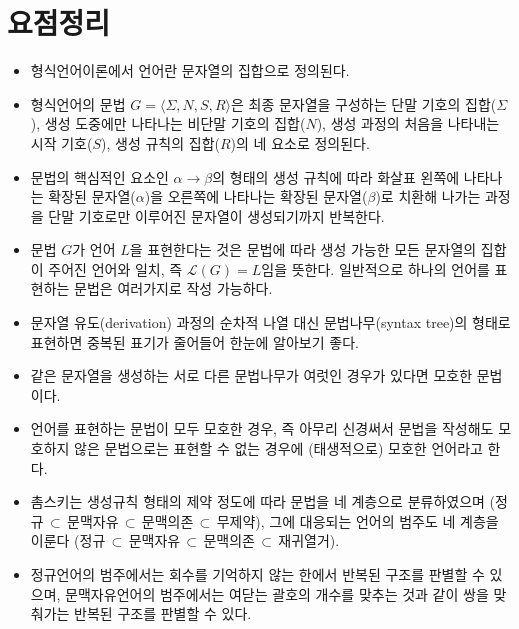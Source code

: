 \section*{요점정리}
\begin{itemize}
    \item 형식언어이론에서 언어란 문자열의 집합으로 정의된다.
    \item 형식언어의 문법 $G=\langle\Sigma,N,S,R\rangle$은
    최종 문자열을 구성하는 단말 기호의 집합($\Sigma$),
    생성 도중에만 나타나는 비단말 기호의 집합($N$),
    생성 과정의 처음을 나타내는 시작 기호($S$),
    생성 규칙의 집합($R$)의 네 요소로 정의된다.
    \item 문법의 핵심적인 요소인 $\alpha\to\beta$의 형태의 생성 규칙에 따라
    화살표 왼쪽에 나타나는 확장된 문자열($\alpha$)을 오른쪽에 나타나는
    확장된 문자열($\beta$)로 치환해 나가는 과정을 단말 기호로만 이루어진
    문자열이 생성되기까지 반복한다.
    \item 문법 $G$가 언어 $L$을 표현한다는 것은 문법에 따라 생성 가능한 모든
    문자열의 집합이 주어진 언어와 일치, 즉 $\mathcal{L}(G) = L$임을 뜻한다.
    일반적으로 하나의 언어를 표현하는 문법은 여러가지로 작성 가능하다.
    \item 문자열 유도(derivation) 과정의 순차적 나열 대신
    문법나무(syntax tree)의 형태로 표현하면 중복된 표기가 줄어들어
    한눈에 알아보기 좋다.
    \item 같은 문자열을 생성하는 서로 다른 문법나무가 여럿인 경우가
    있다면 모호한 문법이다.
    \item 언어를 표현하는 문법이 모두 모호한 경우, 즉 아무리 신경써서
    문법을 작성해도 모호하지 않은 문법으로는 표현할 수 없는 경우에
    (태생적으로) 모호한 언어라고 한다.
    \item 촘스키는 생성규칙 형태의 제약 정도에 따라 문법을 네 계층으로 분류하였으며
    (정규$\,\subset\,$문맥자유$\,\subset\,$문맥의존$\,\subset\,$무제약),
    그에 대응되는 언어의 범주도 네 계층을 이룬다
    (정규$\,\subset\,$문맥자유$\,\subset\,$문맥의존$\,\subset\,$재귀열거).
    \item 정규언어의 범주에서는 회수를 기억하지 않는 한에서 반복된 구조를
    판별할 수 있으며, 문맥자유언어의 범주에서는 여닫는 괄호의 개수를 맞추는
    것과 같이 쌍을 맞춰가는 반복된 구조를 판별할 수 있다.
\end{itemize}

